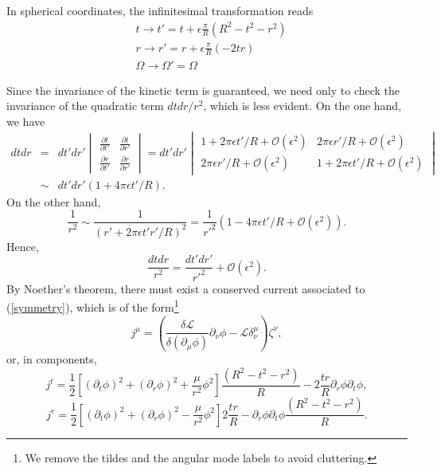 \documentclass[12pt,a4paper]{article}
\begin{document}
In spherical coordinates, the infinitesimal transformation reads
\begin{equation}\label{symmetry}
\begin{split}
& t\longrightarrow t'=t +\epsilon \frac{\pi}{R}(R^2-t^2-r^2)\\
& r\longrightarrow r'=r +\epsilon \frac{\pi}{R}(-2 t r)\\
& \Omega\longrightarrow \Omega'=\Omega
\end{split}
\end{equation}

Since the invariance of the kinetic term is guaranteed, we need only to check the invariance of the quadratic term $dt dr /r^2$, which is less evident. On the one hand, we have
\begin{eqnarray}
dt dr &=& dt' dr'\begin{vmatrix}
\frac{\partial t}{\partial t'} & \frac{\partial t}{\partial r'}\\
\frac{\partial r}{\partial t'} & \frac{\partial r}{\partial r'}
\end{vmatrix}= dt' dr' \begin{vmatrix}
1+2\pi\epsilon	t'/R +\mathcal{O}(\epsilon^2) & 2\pi\epsilon r'/R+\mathcal{O}(\epsilon^2)\\2\pi\epsilon r'/R+\mathcal{O}(\epsilon^2) & 1+2\pi\epsilon t'/R+\mathcal{O}(\epsilon^2)
\end{vmatrix} \nonumber\\
&\sim & dt' dr' (1+4\pi\epsilon t'/R).
\end{eqnarray}
On the other hand, 
\begin{equation}
\frac{1}{r^2}\sim \frac{1}{(r'+2\pi \epsilon t' r' /R)^2}= \frac{1}{r'^2}(1-4\pi\epsilon t'/R+\mathcal{O}(\epsilon^2)).
\end{equation}
Hence, 
\begin{equation}
\frac{dt dr}{r^2}=\frac{dt' dr'}{{r'} ^2}+\mathcal{O}(\epsilon^2).
\end{equation}
By Noether's theorem, there must exist a conserved current associated to (\ref{symmetry}), which is of the form\footnote{We remove the tildes and the angular mode labels to avoid cluttering.}
\begin{equation}
j^{\mu}=\left(\frac{\delta \mathcal{L}}{\delta (\partial_{\mu}\phi)}\partial_{\nu}\phi-\mathcal{L}\delta^{\mu}_{\nu}\right)\zeta^{\nu},
\end{equation}
or, in components,
\begin{equation}
j^t=\frac{1}{2}\left[(\partial_t\phi)^2+(\partial_r \phi)^2+\frac{\mu}{r^2}\phi^2\right]\frac{(R^2-t^2-r^2)}{R}-2 \frac{t r}{R} \partial_r\phi\partial_t\phi,
\end{equation}
\begin{equation}
j^r=\frac{1}{2}\left[(\partial_t\phi)^2+(\partial_r \phi)^2-\frac{\mu}{r^2}\phi^2\right]2\frac{tr}{R} -\partial_r\phi\partial_t\phi \frac{(R^2-t^2-r^2)}{R}.
\end{equation}
\end{document}
